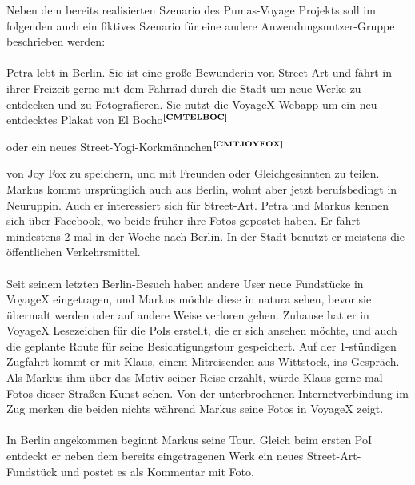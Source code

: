 Neben dem bereits realisierten Szenario des Pumas-Voyage Projekts soll im folgenden auch ein fiktives Szenario für eine andere Anwendungsnutzer-Gruppe beschrieben werden:\\ \\
Petra lebt in Berlin. Sie ist eine große Bewunderin von Street-Art und fährt in ihrer Freizeit gerne mit dem Fahrrad durch die Stadt um neue Werke zu entdecken und zu Fotografieren. Sie nutzt die VoyageX-Webapp um ein neu entdecktes Plakat von El Bocho$^{\textbf{\ref{CMTELBOC}}}$%
\addtocounter{footnote}{1}%
 oder ein neues Street-Yogi-Korkmännchen$^{\textbf{\ref{CMTJOYFOX}}}$%
\addtocounter{footnote}{1}%
 von Joy Fox zu speichern, und mit Freunden oder Gleichgesinnten zu teilen.
\\ %
Markus kommt ursprünglich auch aus Berlin, wohnt aber jetzt berufsbedingt in Neuruppin. Auch er interessiert sich für Street-Art. Petra und Markus kennen sich über Facebook, wo beide früher ihre Fotos gepostet haben. Er fährt mindestens 2 mal in der Woche nach Berlin. In der Stadt benutzt er meistens die öffentlichen Verkehrsmittel.\\ \\
Seit seinem letzten Berlin-Besuch haben andere User neue Fundstücke in VoyageX eingetragen, und Markus möchte diese in natura sehen, bevor sie übermalt werden oder auf andere Weise verloren gehen. Zuhause hat er in VoyageX Lesezeichen für die PoIs erstellt, die er sich ansehen möchte, und auch die geplante Route für seine Besichtigungstour gespeichert. Auf der 1-stündigen Zugfahrt kommt er mit Klaus, einem Mitreisenden aus Wittstock, ins Gespräch. Als Markus ihm über das Motiv seiner Reise erzählt, würde Klaus gerne mal Fotos dieser Straßen-Kunst sehen. Von der unterbrochenen Internetverbindung im Zug merken die beiden nichts während Markus seine Fotos in VoyageX zeigt.\\ \\
In Berlin angekommen beginnt Markus seine Tour. Gleich beim ersten PoI entdeckt er neben dem bereits eingetragenen Werk ein neues Street-Art-Fundstück und postet es als Kommentar mit Foto.\\
